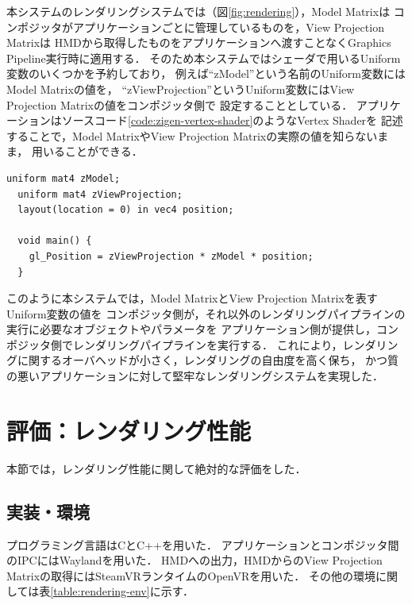 本システムのレンダリングシステムでは（図\ref{fig:rendering}），Model Matrixは
コンポジッタがアプリケーションごとに管理しているものを，View Projection Matrixは
HMDから取得したものをアプリケーションへ渡すことなくGraphics Pipeline実行時に適用する．
そのため本システムではシェーダで用いるUniform変数のいくつかを予約しており，
例えば``zModel''という名前のUniform変数にはModel Matrixの値を，
``zViewProjection''というUniform変数にはView Projection Matrixの値をコンポジッタ側で
設定することとしている．
アプリケーションはソースコード\ref{code:zigen-vertex-shader}のようなVertex Shaderを
記述することで，Model MatrixやView Projection Matrixの実際の値を知らないまま，
用いることができる．

\begin{lstlisting}[caption=本システムでのVertex Shaderの例, label=code:zigen-vertex-shader]
  uniform mat4 zModel;
  uniform mat4 zViewProjection;
  layout(location = 0) in vec4 position;
  
  void main() {
    gl_Position = zViewProjection * zModel * position;
  }
\end{lstlisting}

このように本システムでは，Model MatrixとView Projection Matrixを表すUniform変数の値を
コンポジッタ側が，それ以外のレンダリングパイプラインの実行に必要なオブジェクトやパラメータを
アプリケーション側が提供し，コンポジッタ側でレンダリングパイプラインを実行する．
これにより，レンダリングに関するオーバヘッドが小さく，レンダリングの自由度を高く保ち，
かつ質の悪いアプリケーションに対して堅牢なレンダリングシステムを実現した．


\section{評価：レンダリング性能}

本節では，レンダリング性能に関して絶対的な評価をした．

\subsection{実装・環境}

プログラミング言語はCとC++を用いた．
アプリケーションとコンポジッタ間のIPCにはWaylandを用いた．
HMDへの出力，HMDからのView Projection Matrixの取得にはSteamVRランタイムのOpenVRを用いた．
その他の環境に関しては表\ref{table:rendering-env}に示す．

